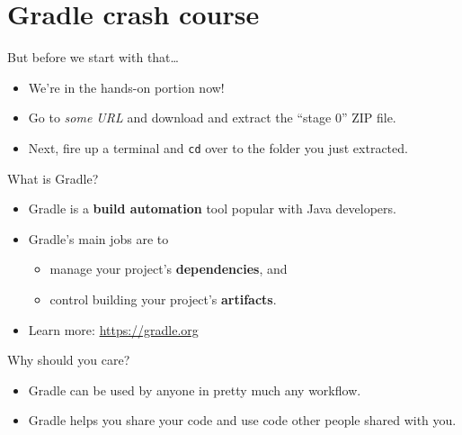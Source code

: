 \section{Gradle crash course}

\begin{frame}{But before we start with that\dots}
\begin{itemize}
    \item We're in the hands-on portion now!
    \item Go to \textit{some URL} and download and extract the ``stage 0'' ZIP file.
    \item Next, fire up a terminal and \texttt{cd} over to the folder you just extracted.
\end{itemize}    
\end{frame}

\begin{frame}{What is Gradle?}
%    
\begin{itemize}
    \item Gradle is a \textbf{build automation} tool popular with Java developers.
    \item Gradle's main jobs are to
    \begin{itemize}
        \item manage your project's \textbf{dependencies}, and
        \item control building your project's \textbf{artifacts}.
    \end{itemize}
    \item Learn more: \url{https://gradle.org}
\end{itemize}    
\end{frame}

\begin{frame}{Why should you care?}
\begin{itemize}
    \item Gradle can be used by anyone in pretty much any workflow.
    \item Gradle helps you share your code and use code other people shared with you.
\end{itemize}
\end{frame}

